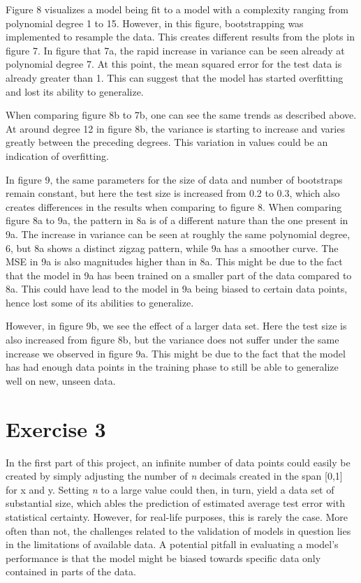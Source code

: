 \documentclass[11pt, a4paper]{article}
\begin{document}
Figure 8 visualizes a model being fit to a model with a complexity ranging from polynomial degree 1 to 15. However, in this figure, bootstrapping was implemented to resample the data. This creates different results from the plots in figure 7. In figure that 7a, the rapid increase in variance can be seen already at polynomial degree 7. At this point, the mean squared error for the test data is already greater than 1.  This can suggest that the model has started overfitting and lost its ability to generalize.

When comparing figure 8b to 7b, one can see the same trends as described above. At around degree 12 in figure 8b, the variance is starting to increase and varies greatly between the preceding degrees. This variation in values could be an indication of overfitting.

In figure 9, the same parameters for the size of data and number of bootstraps remain constant, but here the test size is increased from 0.2 to 0.3, which also creates differences in the results when comparing to figure 8. When comparing figure 8a to 9a, the pattern in 8a is of a different nature than the one present in 9a. The increase in variance can be seen at roughly the same polynomial degree, 6, but 8a shows a distinct zigzag pattern, while 9a has a smoother curve. The MSE in 9a is also magnitudes higher than in 8a. This might be due to the fact that the model in 9a has been trained on a smaller part of the data compared to 8a. This could have lead to the model in 9a being biased to certain data points, hence lost some of its abilities to generalize.

However, in figure 9b, we see the effect of a larger data set. Here the test size is also increased from figure 8b, but the variance does not suffer under the same increase we observed in figure 9a. This might be due to the fact that the model has had enough data points in the training phase to still be able to generalize well on new, unseen data.


\section*{\label{ex:3}Exercise 3}
In the first part of this project, an infinite number of data points could easily be created by simply adjusting the number of \emph{n} decimals created in the span [0,1] for x and y. Setting \emph{n} to a large value could then, in turn, yield a data set of substantial size, which ables the prediction of estimated average test error with statistical certainty. However, for real-life purposes, this is rarely the case. More often than not, the challenges related to the validation of models in question lies in the limitations of available data. A potential pitfall in evaluating a model's performance is that the model might be biased towards specific data only contained in parts of the data.
\end{document}
